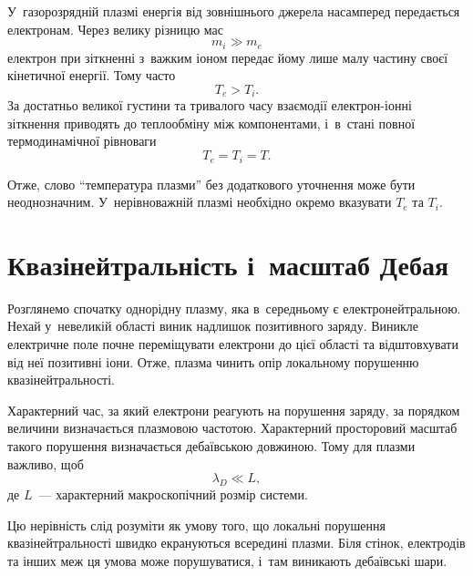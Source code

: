 У~газорозрядній плазмі енергія від зовнішнього джерела насамперед передається електронам. Через велику різницю мас
\begin{equation*}
	m_i\gg m_e
\end{equation*}
електрон при зіткненні з~важким іоном передає йому лише малу частину своєї кінетичної енергії. Тому часто
\begin{equation}
	T_e>T_i.
\end{equation}
За достатньо великої густини та тривалого часу взаємодії електрон-іонні зіткнення приводять до теплообміну між компонентами, і~в~стані повної термодинамічної рівноваги
\begin{equation*}
	T_e=T_i=T.
\end{equation*}

Отже, слово \enquote{температура плазми} без додаткового уточнення може бути неоднозначним. У~нерівноважній плазмі необхідно окремо вказувати $T_e$ та $T_i$.



\section{Квазінейтральність і~масштаб Дебая}



Розглянемо спочатку однорідну плазму, яка в~середньому є електронейтральною. Нехай у~невеликій області виник надлишок позитивного заряду. Виникле електричне поле почне переміщувати електрони до цієї області та відштовхувати від неї позитивні іони. Отже, плазма чинить опір локальному порушенню квазінейтральності.

Характерний час, за який електрони реагують на порушення заряду, за порядком величини визначається плазмовою частотою. Характерний просторовий масштаб такого порушення визначається дебаївською довжиною. Тому для плазми важливо, щоб
\begin{equation}
	\lambda_D\ll L,
\end{equation}
де $L$~--- характерний макроскопічний розмір системи.

Цю нерівність слід розуміти як умову того, що локальні порушення квазінейтральності швидко екрануються всередині плазми. Біля стінок, електродів та інших меж ця умова може порушуватися, і~там виникають дебаївські шари.



